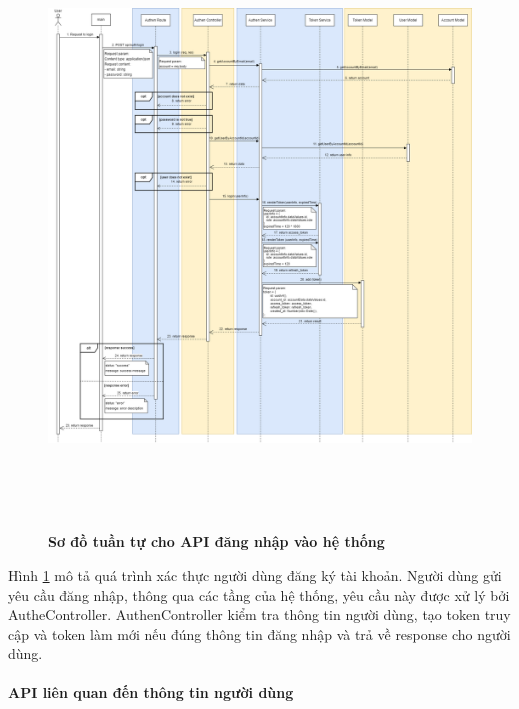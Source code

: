 \begin{figure}[H]
  \centering
  \includegraphics[width=16cm,height=16cm]{Images/sequence_api/login.png}
  \caption[Sơ đồ tuần tự cho API đăng nhập vào hệ thống]{\bfseries \fontsize{12pt}{0pt}
  \selectfont Sơ đồ tuần tự cho API đăng nhập vào hệ thống }
  \label{api_login} %
\end{figure}
Hình \ref{api_login}  mô tả quá trình xác thực người dùng đăng ký tài khoản. Người dùng gửi yêu cầu đăng nhập, thông qua các tầng của hệ thống, yêu cầu này được xử lý bởi AutheController. AuthenController kiểm tra thông tin người dùng, tạo token truy cập và token làm mới 
nếu đúng thông tin đăng nhập và trả về response cho người dùng.





\paragraph{API liên quan đến thông tin người dùng}
\mbox{}

